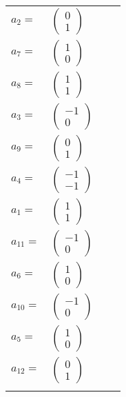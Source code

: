 \documentclass[1p]{elsarticle_modified}
\theoremstyle{definition}
\begin{document}
\begin{tabular}{m{7pt} m{180pt} m{7pt} m{180pt} }
\flushright $a_{2}=$&$\begin{pmatrix}0\\1\end{pmatrix}$ \\
\flushright $a_{7}=$&$\begin{pmatrix}1\\0\end{pmatrix}$ \\
\flushright $a_{8}=$&$\begin{pmatrix}1\\1\end{pmatrix}$ \\
\flushright $a_{3}=$&$\begin{pmatrix}-1\\0\end{pmatrix}$ \\
\flushright $a_{9}=$&$\begin{pmatrix}0\\1\end{pmatrix}$ \\
\flushright $a_{4}=$&$\begin{pmatrix}-1\\-1\end{pmatrix}$ \\
\flushright $a_{1}=$&$\begin{pmatrix}1\\1\end{pmatrix}$ \\
\flushright $a_{11}=$&$\begin{pmatrix}-1\\0\end{pmatrix}$ \\
\flushright $a_{6}=$&$\begin{pmatrix}1\\0\end{pmatrix}$ \\
\flushright $a_{10}=$&$\begin{pmatrix}-1\\0\end{pmatrix}$ \\
\flushright $a_{5}=$&$\begin{pmatrix}1\\0\end{pmatrix}$ \\
\flushright $a_{12}=$&$\begin{pmatrix}0\\1\end{pmatrix}$\\&\end{tabular}
\end{document}
